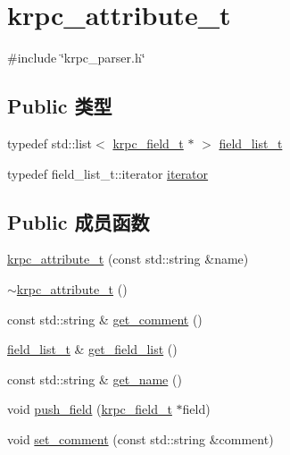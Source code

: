 \hypertarget{classkrpc__attribute__t}{}\section{krpc\+\_\+attribute\+\_\+t}
\label{classkrpc__attribute__t}


{\ttfamily \#include \char`\"{}krpc\+\_\+parser.\+h\char`\"{}}

\subsection*{Public 类型}
\begin{DoxyCompactItemize}
\item 
typedef std\+::list$<$ \hyperlink{classkrpc__field__t}{krpc\+\_\+field\+\_\+t} $\ast$ $>$ \hyperlink{classkrpc__attribute__t_aab478ed2210945e7fc8ee29166274391}{field\+\_\+list\+\_\+t}
\item 
typedef field\+\_\+list\+\_\+t\+::iterator \hyperlink{classkrpc__attribute__t_a7280da1ff086baffe284878d3e955495}{iterator}
\end{DoxyCompactItemize}
\subsection*{Public 成员函数}
\begin{DoxyCompactItemize}
\item 
\hyperlink{classkrpc__attribute__t_aec4c37260dc7712a05005c3b352a6244}{krpc\+\_\+attribute\+\_\+t} (const std\+::string \&name)
\item 
\hyperlink{classkrpc__attribute__t_a6db9b3835b3777cb7453da852987df96}{$\sim$krpc\+\_\+attribute\+\_\+t} ()
\item 
const std\+::string \& \hyperlink{classkrpc__attribute__t_a9128f194c67e1d230e12148e0666388b}{get\+\_\+comment} ()
\item 
\hyperlink{classkrpc__attribute__t_aab478ed2210945e7fc8ee29166274391}{field\+\_\+list\+\_\+t} \& \hyperlink{classkrpc__attribute__t_a29c00d227648b5111cac26d0f4c18b1f}{get\+\_\+field\+\_\+list} ()
\item 
const std\+::string \& \hyperlink{classkrpc__attribute__t_af5cb61288c449788539272f080c1d142}{get\+\_\+name} ()
\item 
void \hyperlink{classkrpc__attribute__t_abf06ff1d62f846bf007bc6b5d5231b1f}{push\+\_\+field} (\hyperlink{classkrpc__field__t}{krpc\+\_\+field\+\_\+t} $\ast$field)
\item 
void \hyperlink{classkrpc__attribute__t_aa6968b6cbbeffbe137669a2d831a0503}{set\+\_\+comment} (const std\+::string \&comment)
\end{DoxyCompactItemize}
